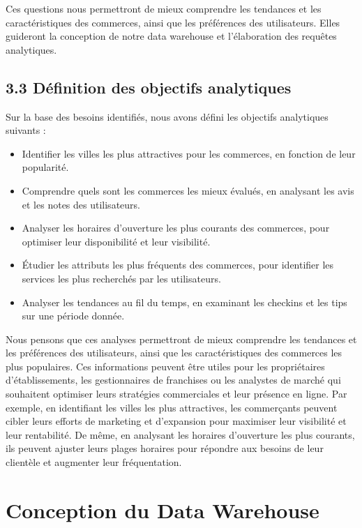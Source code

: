 Ces questions nous permettront de mieux comprendre les tendances et les caractéristiques des commerces, ainsi que les préférences des utilisateurs.
Elles guideront la conception de notre data warehouse et l’élaboration des requêtes analytiques.


\section*{3.3 Définition des objectifs analytiques}

Sur la base des besoins identifiés, nous avons défini les objectifs analytiques suivants :

\begin{itemize}
\item Identifier les villes les plus attractives pour les commerces, en fonction de leur popularité.
\item Comprendre quels sont les commerces les mieux évalués, en analysant les avis et les notes des utilisateurs.
\item Analyser les horaires d’ouverture les plus courants des commerces, pour optimiser leur disponibilité et leur visibilité.
\item Étudier les attributs les plus fréquents des commerces, pour identifier les services les plus recherchés par les utilisateurs.
\item Analyser les tendances au fil du temps, en examinant les checkins et les tips sur une période donnée.
\end{itemize}

Nous pensons que ces analyses permettront de mieux comprendre les tendances et les préférences des utilisateurs, ainsi que les caractéristiques des commerces les plus populaires. Ces informations peuvent être utiles pour les propriétaires d’établissements, les gestionnaires de franchises ou les analystes de marché qui souhaitent optimiser leurs stratégies commerciales et leur présence en ligne.
Par exemple, en identifiant les villes les plus attractives,
les commerçants peuvent cibler leurs efforts de marketing et d’expansion pour maximiser leur visibilité et leur rentabilité.
De même, en analysant les horaires d’ouverture les plus courants, ils peuvent ajuster leurs plages horaires pour répondre aux besoins de leur clientèle et augmenter leur fréquentation.

\chapter*{Conception du Data Warehouse}


